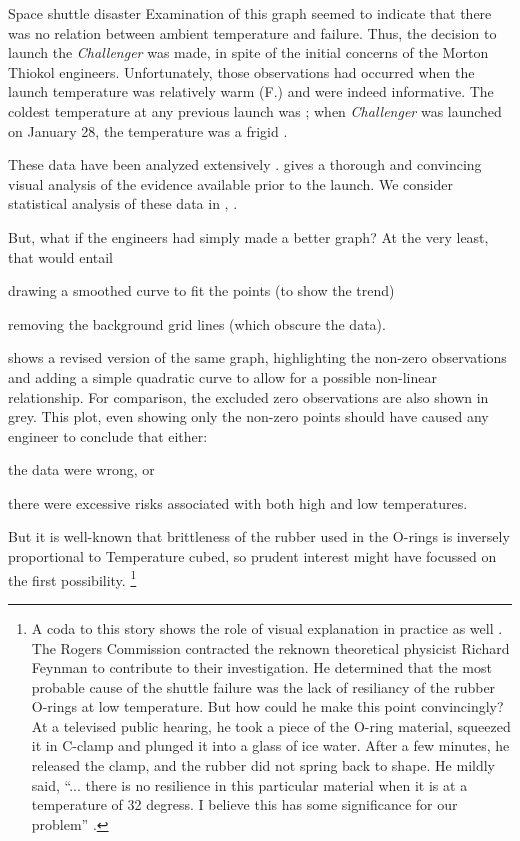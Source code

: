 \documentclass[10pt,krantz2]{krantz}\usepackage[]{graphicx}\usepackage[]{color}
\begin{document}
\begin{Example}[nasa]{Space shuttle disaster}
Examination of this graph seemed to indicate that there was no relation
between ambient temperature and failure.
Thus, the decision to launch
the \emph{Challenger} was made, in spite of the initial concerns
of the Morton Thiokol engineers.
Unfortunately, those observations had occurred when the launch temperature
was relatively warm (F.) and were indeed informative.
The coldest temperature at any previous launch was ;  when \emph{Challenger} was launched on January 28,
the temperature was a frigid .

These data have been analyzed extensively
\citep{Dalal-etal:89,Lavine:91}.
\citet{Tufte:97} gives a thorough and convincing
visual analysis of the evidence available prior to the launch.
We consider statistical analysis of these data in ,
.

But, what if the engineers had simply made a better graph?
At the very least, that would entail
\begin{seriate}
\item drawing a smoothed curve to fit the points (to show the trend)
\item removing the background grid lines (which obscure the data).
\end{seriate}
shows a revised version of the same graph, highlighting
the non-zero observations and adding a simple quadratic
curve to allow for a possible non-linear relationship.
For comparison, the excluded zero observations are also
shown in grey.
This plot, even showing only the non-zero points
should have caused any engineer to conclude that
either:
\begin{seriate}
\item the data were wrong, or
\item there were excessive risks
associated with both high and low temperatures.
\end{seriate}
But it is well-known
that brittleness of the rubber used in the O-rings is inversely
proportional to Temperature cubed, so prudent interest might have focussed
on the first possibility.%
\footnote{A coda to this story shows the role of visual explanation in practice as well
\citep[p. 50--53]{Tufte:97}.
The Rogers Commission contracted the reknown theoretical physicist Richard Feynman
to contribute to their investigation.  He determined that the most probable
cause of the shuttle failure was the lack of resiliancy of the rubber O-rings
at low temperature. But how could he make this point convincingly?
At a televised public hearing, he took a piece of the O-ring material,
squeezed it in C-clamp and plunged it into a glass of ice water.
After a few minutes, he released the clamp, and the rubber did not spring
back to shape.  He mildly said,
``... there is no resilience in this particular material when it is at a
temperature of 32 degress. I believe this has some significance for our
problem'' \citep{Feynman:1988}.
}


\end{Example}
\end{document}
